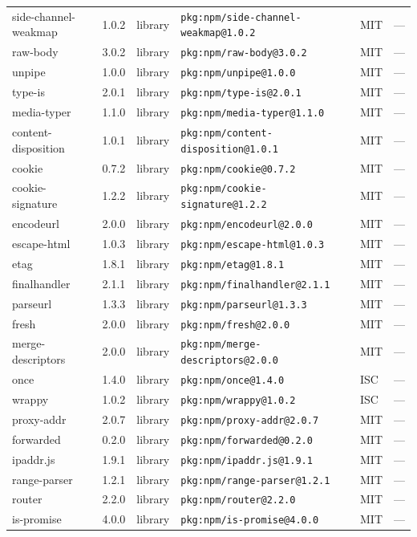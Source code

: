 \documentclass[11pt]{article}
\begin{document}
\begin{longtable}{|l|l|l|p{2.2cm}|l|p{4cm}|}
side-channel-weakmap & 1.0.2 & library & \texttt{pkg:npm/side-channel-weakmap@1.0.2} & MIT & — \\
raw-body & 3.0.2 & library & \texttt{pkg:npm/raw-body@3.0.2} & MIT & — \\
unpipe & 1.0.0 & library & \texttt{pkg:npm/unpipe@1.0.0} & MIT & — \\
type-is & 2.0.1 & library & \texttt{pkg:npm/type-is@2.0.1} & MIT & — \\
media-typer & 1.1.0 & library & \texttt{pkg:npm/media-typer@1.1.0} & MIT & — \\
content-disposition & 1.0.1 & library & \texttt{pkg:npm/content-disposition@1.0.1} & MIT & — \\
cookie & 0.7.2 & library & \texttt{pkg:npm/cookie@0.7.2} & MIT & — \\
cookie-signature & 1.2.2 & library & \texttt{pkg:npm/cookie-signature@1.2.2} & MIT & — \\
encodeurl & 2.0.0 & library & \texttt{pkg:npm/encodeurl@2.0.0} & MIT & — \\
escape-html & 1.0.3 & library & \texttt{pkg:npm/escape-html@1.0.3} & MIT & — \\
etag & 1.8.1 & library & \texttt{pkg:npm/etag@1.8.1} & MIT & — \\
finalhandler & 2.1.1 & library & \texttt{pkg:npm/finalhandler@2.1.1} & MIT & — \\
parseurl & 1.3.3 & library & \texttt{pkg:npm/parseurl@1.3.3} & MIT & — \\
fresh & 2.0.0 & library & \texttt{pkg:npm/fresh@2.0.0} & MIT & — \\
merge-descriptors & 2.0.0 & library & \texttt{pkg:npm/merge-descriptors@2.0.0} & MIT & — \\
once & 1.4.0 & library & \texttt{pkg:npm/once@1.4.0} & ISC & — \\
wrappy & 1.0.2 & library & \texttt{pkg:npm/wrappy@1.0.2} & ISC & — \\
proxy-addr & 2.0.7 & library & \texttt{pkg:npm/proxy-addr@2.0.7} & MIT & — \\
forwarded & 0.2.0 & library & \texttt{pkg:npm/forwarded@0.2.0} & MIT & — \\
ipaddr.js & 1.9.1 & library & \texttt{pkg:npm/ipaddr.js@1.9.1} & MIT & — \\
range-parser & 1.2.1 & library & \texttt{pkg:npm/range-parser@1.2.1} & MIT & — \\
router & 2.2.0 & library & \texttt{pkg:npm/router@2.2.0} & MIT & — \\
is-promise & 4.0.0 & library & \texttt{pkg:npm/is-promise@4.0.0} & MIT & — \\

\end{longtable}
\end{document}
